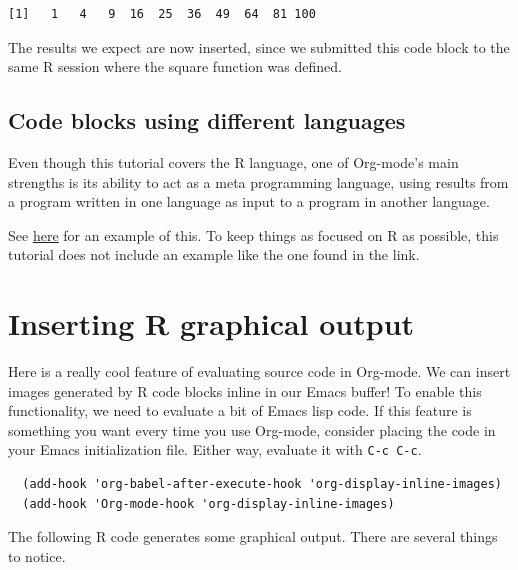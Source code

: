 \documentclass[11pt]{article}
\begin{document}
\begin{verbatim}
[1]   1   4   9  16  25  36  49  64  81 100
\end{verbatim}

The results we expect are now inserted, since we submitted this code block to the same R session where the square function was defined.
\subsection*{Code blocks using different languages}
\label{sec-4-2}

Even though this tutorial covers the R language, one of Org-mode's main strengths is its ability to act as a meta programming language, using results from a program written in one language as input to a program in another language.

See \href{http://orgmode.org/worg/org-contrib/babel/intro.php#meta-programming-language}{here} for an example of this. To keep things as focused on R as possible, this tutorial does not include an example like the one found in the link.
\section*{Inserting R graphical output}
\label{sec-5}

Here is a really cool feature of evaluating source code in Org-mode. We can insert images generated by R code blocks inline in our Emacs buffer! To enable this functionality, we need to evaluate a bit of Emacs lisp code. If this feature is something you want every time you use Org-mode, consider placing the code in your Emacs initialization file. Either way, evaluate it with \texttt{C-c C-c}.

\begin{verbatim}
  (add-hook 'org-babel-after-execute-hook 'org-display-inline-images)   
  (add-hook 'Org-mode-hook 'org-display-inline-images)
\end{verbatim}

The following R code generates some graphical output. There are several things to notice.
\end{document}
